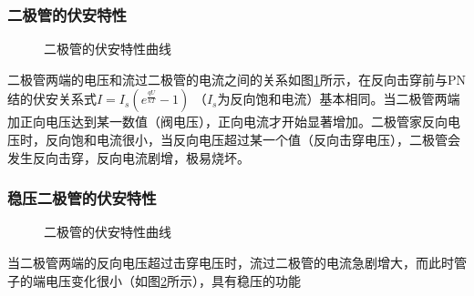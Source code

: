 \documentclass[a4paper,11pt,UTF8]{ctexart}
\begin{document}
	\subsubsection{二极管的伏安特性}
	
	\begin{figure}
		\caption{二极管的伏安特性曲线}
		\label{fig:property1}
	\end{figure}
	
	
	二极管两端的电压和流过二极管的电流之间的关系如图\ref{fig:property1}所示，在反向击穿前与PN结的伏安关系式$I=I_s(e^{\frac{qU}{kT}}-1)$ （$I_s$为反向饱和电流）基本相同。当二极管两端加正向电压达到某一数值（阀电压），正向电流才开始显著增加。二极管家反向电压时，反向饱和电流很小，当反向电压超过某一个值（反向击穿电压），二极管会发生反向击穿，反向电流剧增，极易烧坏。
	
	\subsubsection{稳压二极管的伏安特性}
	
	\begin{figure}
		\caption{二极管的伏安特性曲线}
		\label{fig:property2}
	\end{figure}



	当二极管两端的反向电压超过击穿电压时，流过二极管的电流急剧增大，而此时管子的端电压变化很小（如图\ref{fig:property2}所示），具有稳压的功能
	

	
	
\end{document}
